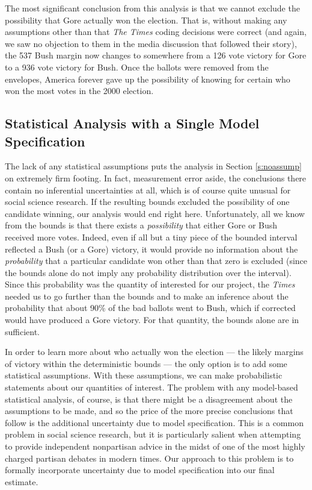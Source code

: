 \documentclass[11pt,titlepage]{article}
\begin{document}
The most significant conclusion from this analysis is that we cannot
exclude the possibility that Gore actually won the election.  That is,
without making any assumptions other than that \emph{The Times} coding
decisions were correct (and again, we saw no objection to them in the
media discussion that followed their story), the 537 Bush margin now
changes to somewhere from a 126 vote victory for Gore to a 936 vote
victory for Bush.  Once the ballots were removed from the envelopes,
America forever gave up the possibility of knowing for certain who won
the most votes in the 2000 election.

\subsection{Statistical Analysis with a Single Model Specification}
\label{s:onemodel} 

The lack of any statistical assumptions puts the analysis in Section
\ref{s:noassump} on extremely firm footing.  In fact, measurement
error aside, the conclusions there contain no inferential
uncertainties at all, which is of course quite unusual for social
science research.  If the resulting bounds excluded the possibility of
one candidate winning, our analysis would end right here.
Unfortunately, all we know from the bounds is that there exists a
\emph{possibility} that either Gore or Bush received more votes.
Indeed, even if all but a tiny piece of the bounded interval reflected
a Bush (or a Gore) victory, it would provide no information about the
\emph{probability} that a particular candidate won other than that
zero is excluded (since the bounds alone do not imply any probability
distribution over the interval).  Since this probability was the
quantity of interested for our project, the \emph{Times} needed us to
go further than the bounds and to make an inference about the
probability that about 90\% of the bad ballots went to Bush, which if
corrected would have produced a Gore victory.  For that quantity, the
bounds alone are in sufficient.

In order to learn more about who actually won the election --- the
likely margins of victory within the deterministic bounds --- the only
option is to add some statistical assumptions.  With these
assumptions, we can make probabilistic statements about our quantities
of interest.  The problem with any model-based statistical analysis,
of course, is that there might be a disagreement about the assumptions
to be made, and so the price of the more precise conclusions that
follow is the additional uncertainty due to model specification.  This
is a common problem in social science research, but it is particularly
salient when attempting to provide independent nonpartisan advice in
the midst of one of the most highly charged partisan debates in modern
times.  Our approach to this problem is to formally incorporate
uncertainty due to model specification into our final estimate.
\end{document}

